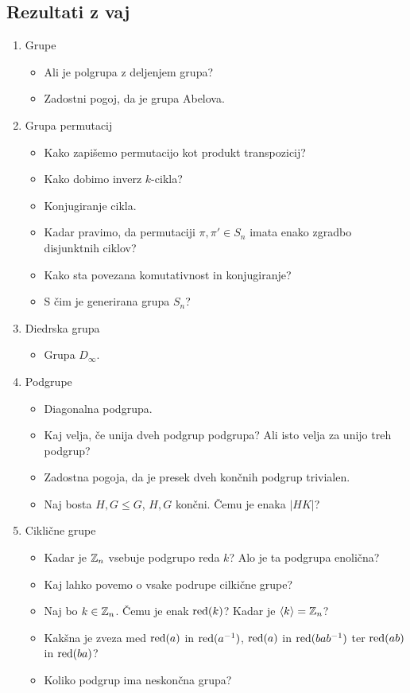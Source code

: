 \subsection*{Rezultati z vaj}
\begin{enumerate}
    \item Grupe
    \begin{itemize}
        \item Ali je polgrupa z deljenjem grupa?
        \item Zadostni pogoj, da je grupa Abelova.
    \end{itemize}
    \item Grupa permutacij
    \begin{itemize}
        \item Kako zapišemo permutacijo kot produkt transpozicij?
        \item Kako dobimo inverz $k$-cikla?
        \item Konjugiranje cikla.
        \item Kadar pravimo, da permutaciji $\pi, \pi' \in S_n$ imata enako zgradbo disjunktnih ciklov?
        \item Kako sta povezana komutativnost in konjugiranje?
        \item S čim je generirana grupa $S_n$?
    \end{itemize}

    \item Diedrska grupa
    \begin{itemize}
        \item Grupa $D_\infty$.
    \end{itemize}

    \item Podgrupe
    \begin{itemize}
        \item Diagonalna podgrupa.
        \item Kaj velja, če unija dveh podgrup podgrupa? Ali isto velja za unijo treh podgrup?
        \item Zadostna pogoja, da je presek dveh končnih podgrup trivialen.
        \item Naj bosta $H, G \leq G$, $H, G$ končni. Čemu je enaka $|HK|$?
    \end{itemize}

    \item Ciklične grupe
    \begin{itemize}
        \item Kadar je $\mathbb{Z}_n$ vsebuje podgrupo reda $k$? Alo je ta podgrupa enolična?
        \item Kaj lahko povemo o vsake podrupe cilkične grupe?
        \item Naj bo $k \in \mathbb{Z}_n$. Čemu je enak $\operatorname{red} (k)$? Kadar je $\left\langle k \right\rangle  = \mathbb{Z}_n$?
        \item Kakšna je zveza med $\operatorname{red} (a)$ in $\operatorname{red} (a^{-1})$, $\operatorname{red} (a)$ in $\operatorname{red} (bab^{-1})$ ter $\operatorname{red} (ab)$ in $\operatorname{red} (ba)$?
        \item Koliko podgrup ima neskončna grupa?
    \end{itemize}
\end{enumerate}